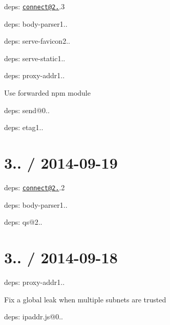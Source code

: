 \begin{DoxyItemize}
\item deps\+: \href{mailto:connect@2.26}{\tt connect@2.}.3
\begin{DoxyItemize}
\item deps\+: body-\/parser1..
\item deps\+: serve-\/favicon2..
\item deps\+: serve-\/static1..
\end{DoxyItemize}
\item deps\+: proxy-\/addr1..
\begin{DoxyItemize}
\item Use {\ttfamily forwarded} npm module
\end{DoxyItemize}
\item deps\+: send@0..
\begin{DoxyItemize}
\item deps\+: etag1..
\end{DoxyItemize}
\end{DoxyItemize}

\section*{3.. / 2014-\/09-\/19 }


\begin{DoxyItemize}
\item deps\+: \href{mailto:connect@2.26}{\tt connect@2.}.2
\begin{DoxyItemize}
\item deps\+: body-\/parser1..
\item deps\+: qs@2..
\end{DoxyItemize}
\end{DoxyItemize}

\section*{3.. / 2014-\/09-\/18 }


\begin{DoxyItemize}
\item deps\+: proxy-\/addr1..
\begin{DoxyItemize}
\item Fix a global leak when multiple subnets are trusted
\item deps\+: ipaddr.\+js@0..
\end{DoxyItemize}
\end{DoxyItemize}

